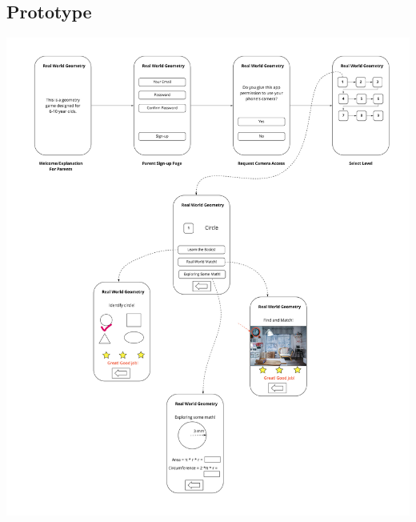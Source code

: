 \documentclass[acmsmall, nonacm]{acmart}
\begin{document}
\begin{appendices}
  \section{Prototype}
  \label{appendix:prototype}
  \includegraphics[width=\textwidth]{prototype.jpg}
  \newpage


\end{appendices}
\end{document}

